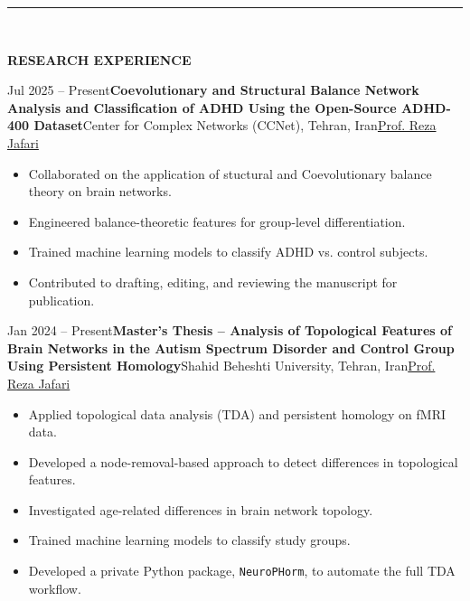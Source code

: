 \documentclass[12pt, b4paper]{cv}
\begin{document}
\vspace{-0.15in}
\rule{\textwidth}{1pt}\\
\vspace{-0.15in}

{\Large \textbf{RESEARCH EXPERIENCE}}
\vspace{0.1in}

\begin{research_exp}{Jul 2025 -- Present}{\textbf{Coevolutionary and Structural Balance Network Analysis and Classification of ADHD Using the Open-Source ADHD-400 Dataset}\vspace{5pt}}{Center for Complex Networks (CCNet), Tehran, Iran}{\href{https://complexity.sbu.ac.ir/professor-reza-jafari/}{Prof. Reza Jafari}}

\vspace{10pt}
\begin{itemize}[leftmargin=*]
    \item Collaborated on the application of stuctural and Coevolutionary balance theory on brain networks.

    \item Engineered balance-theoretic features for group-level differentiation.

    \item Trained machine learning models to classify ADHD vs. control subjects.

    \item Contributed to drafting, editing, and reviewing the manuscript for publication.
\end{itemize}
\end{research_exp}


\begin{research_exp}{Jan 2024 -- Present}{\textbf{Master’s Thesis – Analysis of Topological Features of Brain Networks in the Autism Spectrum Disorder and Control Group Using Persistent Homology}\vspace{5pt}}{Shahid Beheshti University, Tehran, Iran}{\href{https://complexity.sbu.ac.ir/professor-reza-jafari/}{Prof. Reza Jafari}}

\vspace{10pt}
\begin{itemize}[leftmargin=*]
	
	\item Applied topological data analysis (TDA) and persistent homology on fMRI data.

	\item Developed a node-removal-based approach to detect differences in topological features.
	
	\item Investigated age-related differences in brain network topology.

	\item Trained machine learning models to classify study groups.

	\item Developed a private Python package, \texttt{NeuroPHorm}, to automate the full TDA workflow.
\end{itemize}
\end{research_exp}
\end{document}
